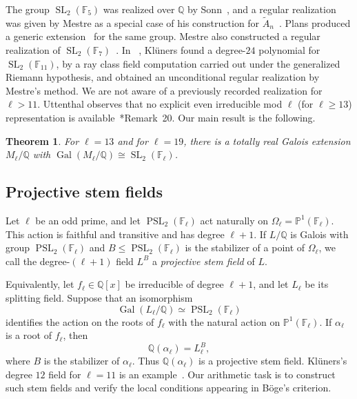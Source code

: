 \documentclass[10pt]{amsart}
\numberwithin{equation}{section}
\newtheorem{theorem}{Theorem}[section]
\theoremstyle{definition}
\theoremstyle{remark}
\newcommand{\PP}{\mathbb P}
\newcommand{\F}{\mathbb{F}}
\newcommand{\Q}{\mathbb{Q}}
\newcommand{\SL}{\operatorname{SL}}
\newcommand{\PSL}{\operatorname{PSL}}
\newcommand{\Gal}{\operatorname{Gal}}
\begin{document}
The group $\SL_2(\F_5)$ was  realized  over
$\Q$ by Sonn~\cite{Sonn1980}, and a regular realization was given by Mestre as
a special case of his construction for $\widetilde A_n$~\cite{Mestre1990}. Plans produced a generic extension~\cite{Plans2007} for the same group. Mestre also
constructed a regular realization of $\SL_2(\F_7)$~\cite{Mestre1994}. In ~\cite{Klueners2000}, Kl\"uners found a degree-$24$ polynomial for $\SL_2(\F_{11})$, by a ray class field
computation carried out under the generalized Riemann hypothesis, and
obtained an unconditional regular realization by Mestre's
method.  We are not aware of a previously recorded
realization for $\ell>11$. 
Uttenthal observes that no explicit even irreducible mod $\ell$ (for $\ell \geq 13$) representation
is available~\cite{Uttenthal2025}*{Remark~20}. Our main result is the following.


\begin{theorem}\label{thm:main}
For $\ell=13$ and for $\ell=19$, there is a totally real Galois extension
$M_\ell/\Q$ with $\Gal(M_\ell/\Q)\cong\SL_2(\F_\ell)$.
\end{theorem}

\subsection{Projective stem fields}\label{subsec:intro-stems}
 Let $\ell$ be an odd prime, and let $\PSL_2(\F_\ell)$ act naturally on
  $\Omega_\ell=\PP^1(\F_\ell)$. This action is faithful and transitive and has
  degree $\ell+1$. If $L/\Q$ is Galois with group $\PSL_2(\F_\ell)$ and
  $B\leq\PSL_2(\F_\ell)$ is the stabilizer of a point of $\Omega_\ell$, we call
  the degree-$(\ell+1)$ field $L^B$ a \emph{projective stem field} of $L$.

  Equivalently, let $f_\ell\in\Q[x]$ be irreducible of degree $\ell+1$, and let
  $L_\ell$ be its splitting field. Suppose that an isomorphism
  \[
   \Gal(L_\ell/\Q)\simeq\PSL_2(\F_\ell)
  \]
  identifies the action on the roots of $f_\ell$ with the natural action on
  $\PP^1(\F_\ell)$. If $\alpha_\ell$ is a root of $f_\ell$, then
  \[
   \Q(\alpha_\ell)=L_\ell^B,
  \]
  where $B$ is the stabilizer of $\alpha_\ell$. Thus $\Q(\alpha_\ell)$ is a
  projective stem field. Kl\"uners's degree $12$ field for $\ell=11$ is an
  example~\cite{Klueners2000}. Our arithmetic task is to construct such stem
  fields and verify the local conditions appearing in B\"oge's criterion.
\end{document}
